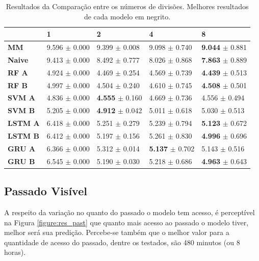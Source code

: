 \begin{table}[htbp]
    \begin{tabular*}{\linewidth}{@{\extracolsep{\fill}}lllll}
    \toprule
     & 
    \multicolumn{1}{l}{\textbf{1}} & 
    \multicolumn{1}{l}{\textbf{2}} &
    \multicolumn{1}{l}{\textbf{4}} &
    \multicolumn{1}{l}{\textbf{8}} \\
    \midrule
    \textbf{MM} & 9.596 $\pm$ 0.000 & 9.399 $\pm$ 0.008 & 9.098 $\pm$ 0.740 & \textbf{9.044} $\pm$ 0.881
    \\
    \midrule
    \textbf{Naive} & 9.413 $\pm$ 0.000 & 8.492 $\pm$ 0.777 & 8.026 $\pm$ 0.868 & \textbf{7.863} $\pm$ 0.889
    \\
    \midrule
    \textbf{RF A} & 4.924 $\pm$ 0.000 & 4.469 $\pm$ 0.254 & 4.569 $\pm$ 0.739 & \textbf{4.439} $\pm$ 0.513
    \\
    \midrule
    \textbf{RF B} & 4.997 $\pm$ 0.000 & 4.504 $\pm$ 0.240 & 4.610 $\pm$ 0.745 & \textbf{4.508} $\pm$ 0.501
    \\
    \midrule
    \textbf{SVM A} & 4.836 $\pm$ 0.000 & \textbf{4.555} $\pm$ 0.160 & 4.669 $\pm$ 0.736 & 4.556 $\pm$ 0.494
    \\
    \midrule
    \textbf{SVM B} & 5.205 $\pm$ 0.000 & \textbf{4.912} $\pm$ 0.042 & 5.011 $\pm$ 0.618 & 5.030 $\pm$ 0.513
    \\
    \midrule
    \textbf{LSTM A} & 6.418 $\pm$ 0.000 & 5.251 $\pm$ 0.279 & 5.239 $\pm$ 0.794 & \textbf{5.123} $\pm$ 0.672
    \\
    \midrule
    \textbf{LSTM B} & 6.412 $\pm$ 0.000 & 5.197 $\pm$ 0.156 & 5.261 $\pm$ 0.830 & \textbf{4.996} $\pm$ 0.696
    \\
    \midrule
    \textbf{GRU A} & 6.366 $\pm$ 0.000 & 5.312 $\pm$ 0.014 & \textbf{5.137} $\pm$ 0.702 & 5.143 $\pm$ 0.516
    \\
    \midrule
    \textbf{GRU B} & 6.545 $\pm$ 0.000 & 5.190 $\pm$ 0.030 & 5.218 $\pm$ 0.686 & \textbf{4.963} $\pm$ 0.643
    \\
    \bottomrule
    \end{tabular*}
    \label{table:res_split}
    \caption{Resultados da Comparação entre os números de divisões. Melhores resultados de cada modelo em negrito.}
\end{table}

\subsection{Passado Visível}

A respeito da variação no quanto do passado o modelo tem acesso, é perceptível na Figura \ref{figure:res_past} que quanto mais acesso ao passado o modelo tiver, melhor será sua predição. Percebe-se também que o melhor valor para a quantidade de acesso do passado, dentre os testados, são 480 minutos (ou 8 horas). 

